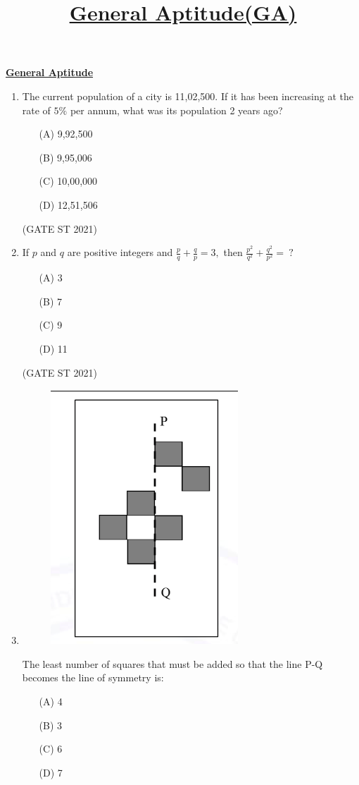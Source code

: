 \documentclass[journal,12pt,onecolumn]{IEEEtran}
\title{\textbf{\underline{General Aptitude(GA)}}}
\author{}
\date{}
\theoremstyle{remark}
\begin{document}
\textbf{\underline{General Aptitude}}

\begin{enumerate}
\item 
The current population of a city is 11,02,500. If it has been increasing at the rate of $5\%$ per annum, what was its population 2 years ago?

\begin{enumerate}
\item[(A)] 9,92,500
\item[(B)] 9,95,006
\item[(C)] 10,00,000
\item[(D)] 12,51,506
\end{enumerate}

\hfill (GATE ST 2021)\\

\item If $p$ and $q$ are positive integers and
$
\frac{p}{q} + \frac{q}{p} = 3,
$
then
$
\frac{p^{2}}{q^{2}} + \frac{q^{2}}{p^{2}} = \ ?
$
\begin{enumerate}
\item[(A)] 3
\item[(B)] 7
\item[(C)] 9
\item[(D)] 11
\end{enumerate}

\hfill (GATE ST 2021) 


\item 

\begin{figure}[h]
    \centering
    \includegraphics[width=0.2\linewidth]{figs/3.png}
    \caption{}
    \label{fig:1}
\end{figure}

The least number of squares that must be added so that the line P-Q becomes the line of symmetry is:

\begin{enumerate}
\item[(A)] 4
\item[(B)] 3
\item[(C)] 6
\item[(D)] 7
\end{enumerate}


\end{enumerate}
\end{document}
